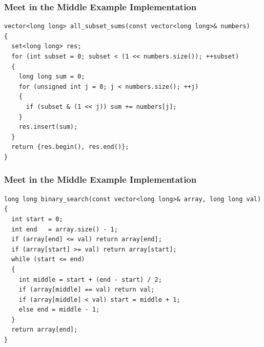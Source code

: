 \documentclass{beamer}
\newcommand{\codeforceslink}[2]{CodeForces (http://www.codeforces.com)
  problem: \href{#2}{\textcolor{blue}{#1}.}}
\newcounter{exo}
\newcommand{\exo}{
  \addtocounter{exo}{1}
  Exercice \arabic{exo}
}
\begin{document}
\begin{frame}[containsverbatim]
\frametitle{Meet in the Middle Example Implementation}

\scriptsize

\begin{lstlisting}
vector<long long> all_subset_sums(const vector<long long>& numbers)
{
  set<long long> res;
  for (int subset = 0; subset < (1 << numbers.size()); ++subset)
  {
    long long sum = 0;
    for (unsigned int j = 0; j < numbers.size(); ++j)
    {
      if (subset & (1 << j)) sum += numbers[j];
    }
    res.insert(sum);
  }
  return {res.begin(), res.end()};
}
\end{lstlisting}

\end{frame}

\begin{frame}[containsverbatim]
\frametitle{Meet in the Middle Example Implementation}

\scriptsize

\begin{lstlisting}
long long binary_search(const vector<long long>& array, long long val)
{
  int start = 0;
  int end   = array.size() - 1;
  if (array[end] <= val) return array[end];
  if (array[start] >= val) return array[start];
  while (start <= end)
  {
    int middle = start + (end - start) / 2;
    if (array[middle] == val) return val;
    if (array[middle] < val) start = middle + 1;
    else end = middle - 1;
  }
  return array[end];
}
\end{lstlisting}

\end{frame}


\ifanswers
\end{document}
